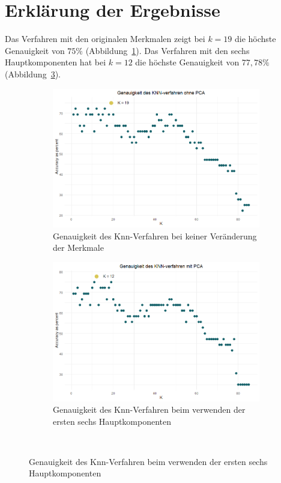 \documentclass[envcountsame, envcountchap, deutsch]{i-studis}
\begin{document}
\section{Erklärung der Ergebnisse}
Das Verfahren mit den originalen Merkmalen zeigt bei $k = 19$ die höchste Genauigkeit von $75\%$ (Abbildung~\ref{fig:acc_knn_normal}). Das Verfahren mit den sechs
Hauptkomponenten hat bei $k = 12$ die höchste Genauigkeit von $77,78\%$ (Abbildung~\ref{fig:acc_knn_pca}). 
\begin{figure}
    \centering

    \begin{subfigure}{\textwidth}
        \includegraphics[width=\linewidth]{accuracy_knn_no_pca.png}
        \caption{Genauigkeit des Knn-Verfahren bei keiner Veränderung der Merkmale}\label{fig:acc_knn_normal}
    \end{subfigure}
    \vspace{1cm}
    \begin{subfigure}{\textwidth}
        \includegraphics[width=\linewidth]{accuracy_knn_with_pca.png}
        \caption{Genauigkeit des Knn-Verfahren beim verwenden der ersten sechs Hauptkomponenten}\label{fig:acc_knn_pca}
    \end{subfigure}     
    \
\end{figure}
\end{document}
